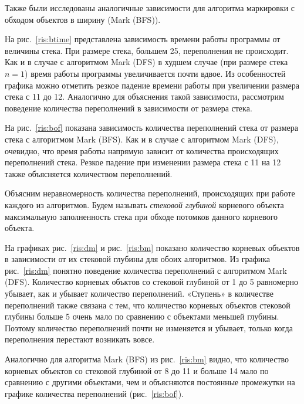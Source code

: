 Также были исследованы аналогичные зависимости для алгоритма маркировки с обходом объектов в ширину (Mark (BFS)).

На рис.~\ref{ris:btime} представлена зависимость времени работы программы от величины стека. 
При размере стека, большем 25, переполнения не происходит. Как и в случае с алгоритмом Mark (DFS) в худшем случае (при размере стека $n = 1$) время работы программы
увеличивается почти вдвое. Из особенностей графика можно отметить резкое падение времени работы при увеличении размера стека с 11 до 12. Аналогично для объяснения 
такой зависимости, рассмотрим поведение количества переполнений в зависимости от размера стека.

На рис.~\ref{ris:bof} показана зависимость количества переполнений стека от размера стека с алгоритмом Mark (BFS). Как и в случае с алгоритмом Mark (DFS), очевидно, 
что время работы напрямую зависит от количества происходящих переполнений стека. Резкое падение при изменении размера стека с 11 на 12 также объясняется количеством 
переполнений.

Объясним неравномерность количества переполнений, происходящих при работе каждого из алгоритмов. Будем называть {\it стековой глубиной } корневого объекта максимальную заполненность стека при обходе потомков данного 
корневого объекта.

На графиках рис.~\ref{ris:dm} и рис.~\ref{ris:bm} показано количество корневых объектов в зависимости от их стековой глубины для обоих алгоритмов. 
Из графика рис.~\ref{ris:dm} понятно поведение количества переполнений с алгоритмом Mark (DFS). Количество корневых 
объктов со стековой глубиной от 1 до 5 равномерно убывает, как и убывает количество переполнений. «Ступень» в количестве переполнений также связана с тем, 
что количество корневых объектов стековой глубины больше 5 очень мало по сравнению с объектами меньшей глубины. Поэтому количество переполнений почти не изменяется и 
убывает, только когда переполнения перестают возникать вовсе.

Аналогично для алгоритма Mark (BFS) из рис.~\ref{ris:bm} видно, что количество корневых объектов со стековой глубиной от 8 до 11 и больше 14 мало по сравнению с другими 
объектами, чем и объясняются постоянные промежутки на графике количества переполнений (рис.~\ref{ris:bof}).

